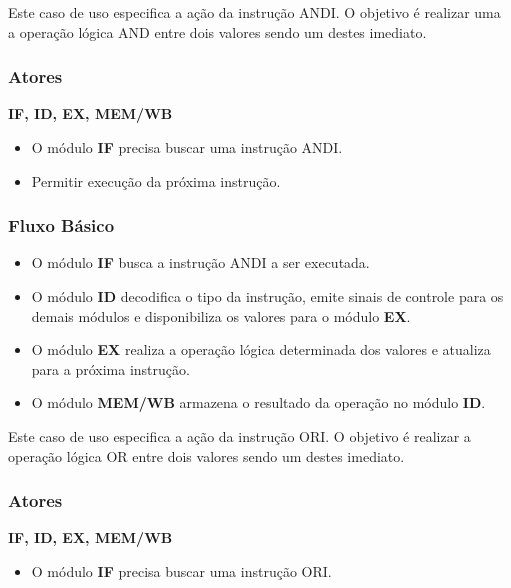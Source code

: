 
Este caso de uso especifica a ação da instrução ANDI. O objetivo é realizar uma a operação lógica AND entre dois valores sendo um destes imediato.

\subsubsection*{Atores}
\textbf{IF, ID, EX, MEM/WB}

\preconditions 
\begin{itemize}
	\item O módulo \textbf{IF} precisa buscar uma instrução ANDI.
\end{itemize}

\postconditions
\begin{itemize}	
	\item Permitir execução da próxima instrução.
\end{itemize}

\subsubsection*{Fluxo Básico}
\begin{itemize}
	\item O módulo \textbf{IF} busca a instrução ANDI a ser executada.
	\item O módulo \textbf{ID} decodifica o tipo da instrução, emite sinais de controle para os demais módulos e disponibiliza os valores para o módulo \textbf{EX}.
	\item O módulo \textbf{EX} realiza a operação lógica determinada dos valores e atualiza para a próxima instrução.
	\item O módulo \textbf{MEM/WB} armazena o resultado da operação no módulo \textbf{ID}.
\end{itemize}



Este caso de uso especifica a ação da instrução ORI. O objetivo é realizar a operação lógica OR entre dois valores sendo um destes imediato.

\subsubsection*{Atores}
\textbf{IF, ID, EX, MEM/WB}

\preconditions 
\begin{itemize}
	\item O módulo \textbf{IF} precisa buscar uma instrução ORI.
\end{itemize}

